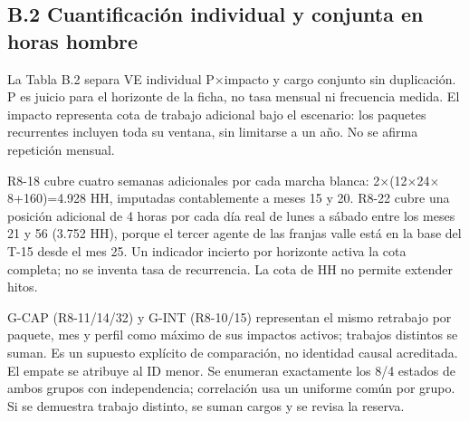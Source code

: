 \subsection*{B.2 Cuantificación individual y conjunta en horas hombre}

La Tabla B.2 separa VE individual P\ensuremath{\times}impacto y cargo conjunto sin duplicación. P es juicio para el horizonte de la ficha, no tasa mensual ni frecuencia medida. El impacto representa cota de trabajo adicional bajo el escenario: los paquetes recurrentes incluyen toda su ventana, sin limitarse a un año. No se afirma repetición mensual.

R8-18 cubre cuatro semanas adicionales por cada marcha blanca: 2\ensuremath{\times}(12\ensuremath{\times}24\ensuremath{\times}8+160)=4.928 HH, imputadas contablemente a meses 15 y 20. R8-22 cubre una posición adicional de 4 horas por cada día real de lunes a sábado entre los meses 21 y 56 (3.752 HH), porque el tercer agente de las franjas valle está en la base del T-15 desde el mes 25. Un indicador incierto por horizonte activa la cota completa; no se inventa tasa de recurrencia. La cota de HH no permite extender hitos.

G-CAP (R8-11/14/32) y G-INT (R8-10/15) representan el mismo retrabajo por paquete, mes y perfil como máximo de sus impactos activos; trabajos distintos se suman. Es un supuesto explícito de comparación, no identidad causal acreditada. El empate se atribuye al ID menor. Se enumeran exactamente los 8/4 estados de ambos grupos con independencia; correlación usa un uniforme común por grupo. Si se demuestra trabajo distinto, se suman cargos y se revisa la reserva.

